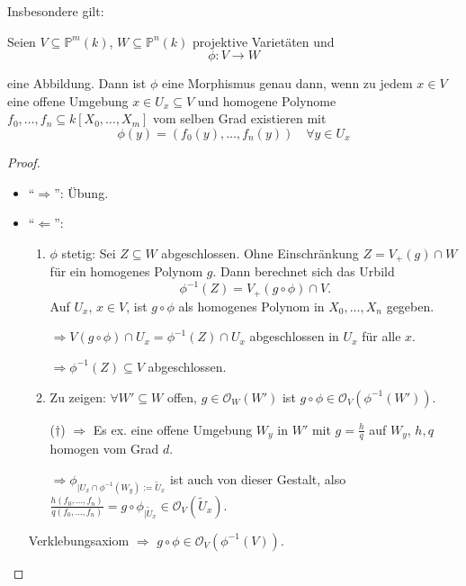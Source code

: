 Insbesondere gilt:
\begin{prop}[orig. 56]
  \label{prop:charakterisierung-morphismen-proj-varietaeten}
  Seien $V\subseteq\mathbb{P}^{m}(k)$, $W\subseteq\mathbb{P}^{n}(k)$
  projektive Varietäten und
  \[
    \phi: V \longrightarrow W
  \]

  eine Abbildung. Dann ist $\phi$ eine Morphismus genau dann, wenn
  zu jedem $x\in V$ eine offene Umgebung $x\in U_{x}\subseteq V$ und
  homogene Polynome $f_{0},\ldots,f_{n}\subseteq k[X_{0},\ldots,X_{m}]$
  vom selben Grad existieren mit
  \[
    \phi(y)=(f_{0}(y),\ldots,f_{n}(y))\quad\forall y\in U_{x}
  \]
\end{prop}
\begin{proof}
  \mbox{}
  \begin{itemize}
  \item ``$\Rightarrow$'': Übung.
  \item ``$\Leftarrow$'':
    \begin{enumerate}
    \item $\phi$ stetig: Sei $Z\subseteq W$ abgeschlossen. Ohne Einschränkung
      $Z=V_{+}(g)\cap W$ für ein homogenes Polynom $g$. Dann berechnet
      sich das Urbild
      \[
        \phi^{-1}(Z)=V_{+}(g\circ\phi)\cap V.
      \]
      Auf $U_{x}$, $x\in V$, ist $g\circ\phi$ als homogenes Polynom in
      $X_{0},\ldots,X_{n}$ gegeben. 

      $\Rightarrow V(g\circ\phi)\cap U_{x}=\phi^{-1}(Z)\cap U_{x}$ abgeschlossen
      in $U_{x}$ für alle $x$.

      $\Rightarrow\phi^{-1}(Z)\subseteq V$ abgeschlossen.
    \item Zu zeigen: $\forall W'\subseteq W$ offen, $g\in\mathcal{O}_{W}(W')$
      ist $g\circ\phi\in\mathcal{O}_{V}(\phi^{-1}(W'))$.

      ($\dagger$) $\Rightarrow$ Es ex. eine offene Umgebung $W_{y}$ in $W'$
      mit $g=\frac{h}{q}$ auf $W_{y}$, $h,q$ homogen vom Grad $d$.

      $\Rightarrow\phi_{|U_{x}\cap\phi^{-1}(W_{y}):=\tilde{U}_{x}}$ ist
      auch von dieser Gestalt, also $\frac{h(f_{0},\ldots,f_{n})}{q(f_{0},\ldots,f_{n})}=g\circ\phi_{|\tilde{U}_{x}}\in\mathcal{O}_{V}(\tilde{U}_{x})$.
    \end{enumerate}
    Verklebungsaxiom $\Rightarrow$ $g\circ\phi\in\mathcal{O}_{V}(\phi^{-1}(V))$.
  \end{itemize}
\end{proof}

